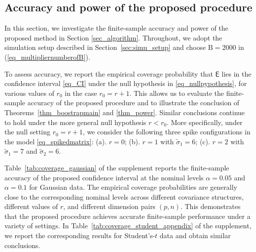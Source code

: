 \documentclass[12pt]{article}
\theoremstyle{plain}
\numberwithin{equation}{section}
\begin{document}
\subsection{Accuracy and power of the proposed procedure}\label{sec_simuanalysisofouralgorithm}
In this section, we investigate the finite-sample accuracy and power of the proposed method in Section \ref{sec_algorithm}.  Throughout, we adopt the simulation setup described in Section~\ref{sec:simu_setup} and choose $\mathrm{B}=2000$ in (\ref{eq_multipliernumberofB}). 


To assess accuracy, we report the empirical coverage probability that $\mathsf E$ lies in the confidence interval \eqref{eq_CI} under the null hypothesis in \eqref{eq_nullpypothesis}, for various values of $r_0$ in the case $r_0=r+1$. This allows us to evaluate the finite-sample accuracy of the proposed procedure and to illustrate the conclusion of Theorems~\ref{thm_boostrapmain} and \ref{thm_power}. Similar conclusions continue to hold under the more general null hypothesis $r<r_0$. More specifically, under the null setting $r_0=r+1$, we consider the following three spike configurations in the model \eqref{eq_spikedmatrix}: (a). $r=0$; (b). $r=1$ with $\widetilde{\sigma}_1=6$; (c). $r=2$ with $\widetilde{\sigma}_1=7$ and $\widetilde{\sigma}_2=6$.





Table~\ref{tab:coverage_gaussian} of the supplement reports the finite-sample accuracy of the proposed confidence interval at the nominal levels $\alpha=0.05$ and $\alpha=0.1$ for Gaussian data. The empirical coverage probabilities are generally close to the corresponding nominal levels across different covariance structures, different values of $r$, and different dimension pairs $(p,n)$. This demonstrates that the proposed procedure achieves accurate finite-sample performance under a variety of settings. In Table~\ref{tab:coverage_student_appendix} of the supplement, we report the corresponding results for Student's-$t$ data and obtain similar conclusions.
\end{document}
